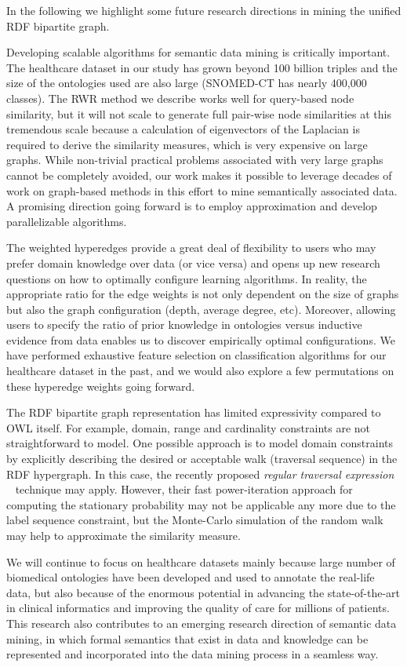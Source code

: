 In the following we highlight some future research directions in mining the unified RDF bipartite graph.

Developing scalable algorithms for semantic data mining is critically important. The healthcare dataset in our study has grown beyond 100 billion triples and the size of the ontologies used are also large (SNOMED-CT has nearly 400,000 classes). The RWR method we describe works well for query-based node similarity, but it will not scale to generate full pair-wise node similarities at this tremendous scale because a calculation of eigenvectors of the Laplacian is required to derive the similarity measures, which is very expensive on large graphs. While non-trivial practical problems associated with very large graphs cannot be completely avoided, our work makes it possible to leverage decades of work on graph-based methods in this effort to mine semantically associated data. A promising direction going forward is to employ approximation and develop parallelizable algorithms.

The weighted hyperedges provide a great deal of flexibility to users who may prefer domain knowledge over data (or vice versa) and opens up new research questions on how to optimally configure learning algorithms. In reality, the appropriate ratio for the edge weights is not only dependent on the size of graphs but also the graph configuration (depth, average degree, etc). Moreover, allowing users to specify the ratio of prior knowledge in ontologies versus inductive evidence from data enables us to discover empirically optimal configurations. We have performed exhaustive feature selection on classification algorithms for our healthcare dataset in the past, and we would also explore a few permutations on these hyperedge weights going forward.

The RDF bipartite graph representation has limited expressivity compared to OWL itself. For example, domain, range and cardinality constraints are not straightforward to model.  One possible approach is to model domain constraints by explicitly describing the desired or acceptable walk (traversal sequence) in the RDF hypergraph. In this case, the recently proposed \emph{regular traversal expression} ~\cite{Marko10} technique may apply. However, their fast power-iteration approach for computing the stationary probability may not be applicable any more due to the label sequence constraint, but the Monte-Carlo simulation of the random walk may help to approximate the similarity measure.

We will continue to focus on healthcare datasets mainly because large number of biomedical ontologies have been developed and used to annotate the real-life data, but also because of the enormous potential in advancing the state-of-the-art in clinical informatics and improving the quality of care for millions of patients. This research also contributes to an emerging research direction of semantic data mining, in which formal semantics that exist in data and knowledge can be represented and incorporated into the data mining process in a seamless way.



